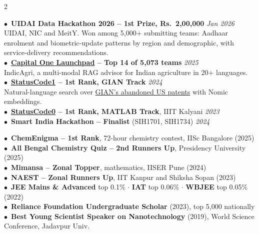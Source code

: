 \documentclass[a4paper,10.5pt]{extarticle}
\newcommand{\subhead}[1]{\vspace{1pt}{\normalsize\bfseries #1}\par\vspace{1pt}}
\begin{document}
\begin{paracol}{2}
\subhead{Hackathons}
{\small
$\bullet$~\textbf{UIDAI Data Hackathon 2026 -- 1st Prize, Rs.~2,00,000} \href{https://event.data.gov.in/challenge/uidai-data-hackathon-2026/}{\faGlobe} \hfill \textit{Jan 2026}\\
\hspace*{0.8em}UIDAI, NIC and MeitY. Won among 5,000+ submitting teams: Aadhaar enrolment and biometric-update patterns by region and demographic, with service-delivery recommendations.\\[2.5pt]
$\bullet$~\textbf{\href{https://capitalone.hackerearth.com/}{Capital One Launchpad} -- Top 14 of 5,073 teams} \href{https://github.com/Shuvam-Banerji-Seal/Answering_Agriculture}{\faGithub} \hfill \textit{2025}\\
\hspace*{0.8em}IndicAgri, a multi-modal RAG advisor for Indian agriculture in 20+ languages.\\[2.5pt]
$\bullet$~\textbf{\href{https://statuscode-1.devfolio.co/}{StatusCode1} -- 1st Rank, GIAN Track} \href{https://github.com/Shuvam-Banerji-Seal/LLM-based-Searcher-for-GIAN-s-Abandoned-US-Patents}{\faGithub} \hfill \textit{2024}\\
\hspace*{0.8em}Natural-language search over \href{https://gian.org/abandoned-us-patents/}{GIAN's abandoned US patents} with Nomic embeddings.\\[2.5pt]
$\bullet$~\textbf{\href{https://statuscode0.devfolio.co/}{StatusCode0} -- 1st Rank, MATLAB Track}, IIIT Kalyani \hfill \textit{2023}\\[2.5pt]
$\bullet$~\textbf{Smart India Hackathon -- Finalist} (SIH1701, SIH1734) \hfill \textit{2024}
}

\subhead{Competitions, Examinations \& Honours}
{\small
$\bullet$~\textbf{ChemEnigma -- 1st Rank}, 72-hour chemistry contest, IISc Bangalore (2025)\\
$\bullet$~\textbf{All Bengal Chemistry Quiz -- 2nd Runners Up}, Presidency University (2025)\\
$\bullet$~\textbf{Mimansa -- Zonal Topper}, mathematics, IISER Pune (2024)\\
$\bullet$~\textbf{NAEST -- Zonal Runners Up}, IIT Kanpur and Shiksha Sopan (2023)\\
$\bullet$~\textbf{JEE Mains \& Advanced} top 0.1\% $\cdot$ \textbf{IAT} top 0.06\% $\cdot$ \textbf{WBJEE} top 0.05\% (2022)\\
$\bullet$~\textbf{Reliance Foundation Undergraduate Scholar} (2023), top 5,000 nationally\\
$\bullet$~\textbf{Best Young Scientist Speaker on Nanotechnology} (2019), World Science Conference, Jadavpur Univ.
}

\end{paracol}
\end{document}
